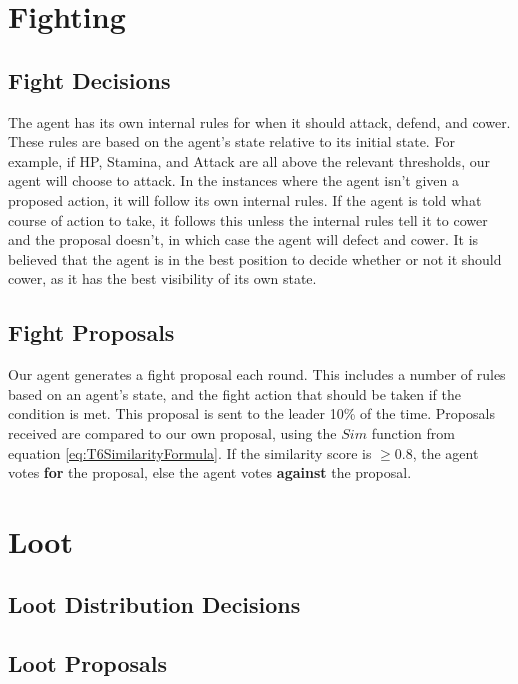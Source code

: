 \section{Fighting}

\subsection{Fight Decisions}

The agent has its own internal rules for when it should attack, defend, and cower. These rules are based on the agent's state relative to its initial state. For example, if HP, Stamina, and Attack are all above the relevant thresholds, our agent will choose to attack. In the instances where the agent isn't given a proposed action, it will follow its own internal rules. If the agent is told what course of action to take, it follows this unless the internal rules tell it to cower and the proposal doesn't, in which case the agent will defect and cower. It is believed that the agent is in the best position to decide whether or not it should cower, as it has the best visibility of its own state.

\subsection{Fight Proposals}\label{T6FightProposals}

Our agent generates a fight proposal each round. This includes a number of rules based on an agent's state, and the fight action that should be taken if the condition is met. This proposal is sent to the leader 10\% of the time.
Proposals received are compared to our own proposal, using the $Sim$ function from equation \ref{eq:T6SimilarityFormula}. If the similarity score is $\geq 0.8$, the agent votes \textbf{for} the proposal, else the agent votes \textbf{against} the proposal.

\section{Loot}

\subsection{Loot Distribution Decisions}

\subsection{Loot Proposals}

